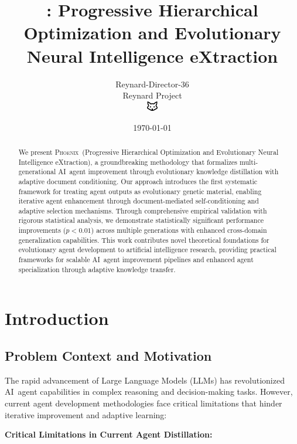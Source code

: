 \documentclass[10pt]{article}
\title{\phoenix: Progressive Hierarchical Optimization and Evolutionary Neural Intelligence eXtraction}
\author{Reynard-Director-36\\
Reynard Project\\
\includegraphics[width=0.5cm]{../../shared-assets/favicon.pdf}}
\date{\today}
\theoremstyle{definition}
\newcommand{\phoenix}{\textsc{Phoenix}}
\newcommand{\llm}{\textsc{LLM}}
\newcommand{\ai}{\textsc{AI}}
\begin{document}
\maketitle

\begin{abstract}
We present \phoenix\ (Progressive Hierarchical Optimization and Evolutionary Neural Intelligence eXtraction), a groundbreaking methodology that formalizes multi-generational \ai\ agent improvement through evolutionary knowledge distillation with adaptive document conditioning. Our approach introduces the first systematic framework for treating agent outputs as evolutionary genetic material, enabling iterative agent enhancement through document-mediated self-conditioning and adaptive selection mechanisms. Through comprehensive empirical validation with rigorous statistical analysis, we demonstrate statistically significant performance improvements ($p < 0.01$) across multiple generations with enhanced cross-domain generalization capabilities. This work contributes novel theoretical foundations for evolutionary agent development to artificial intelligence research, providing practical frameworks for scalable \ai\ agent improvement pipelines and enhanced agent specialization through adaptive knowledge transfer.
\end{abstract}

\section{Introduction}

\subsection{Problem Context and Motivation}

The rapid advancement of Large Language Models (\llm s) has revolutionized \ai\ agent capabilities in complex reasoning and decision-making tasks. However, current agent development methodologies face critical limitations that hinder iterative improvement and adaptive learning:

\textbf{Critical Limitations in Current Agent Distillation:}
\end{document}
